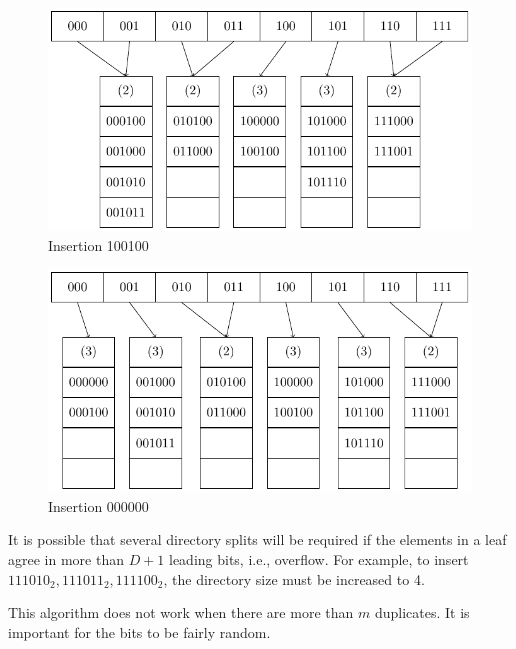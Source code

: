 \begin{center}
\begin{minipage}{0.48\textwidth}
\begin{figure}[H]
  \centering
  \includegraphics[width=\textwidth]{Figure/EH3.pdf}
  \caption{Insertion 100100}
\end{figure}
\end{minipage}\quad
\begin{minipage}{0.48\textwidth}
\begin{figure}[H]
  \centering
  \includegraphics[width=\textwidth]{Figure/EH4.pdf}
  \caption{Insertion 000000}
\end{figure}
\end{minipage}
\end{center}

It is possible that several directory splits will be required if the elements in a leaf agree in more than \(D + 1\) leading bits, i.e., overflow. For example, to insert \(111010_2, 111011_2, 111100_2\), the directory size must be increased to 4. 

This algorithm does not work when there are more than \(m\) duplicates. It is important for the bits to be fairly random. 

